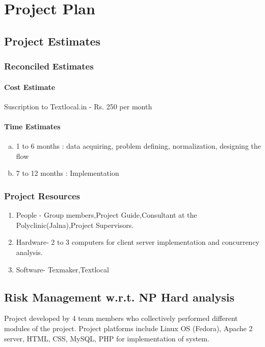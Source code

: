 \documentclass[oneside,a4paper,12pt]{book}
\begin{document}
\chapter{Project Plan}

\section{Project Estimates}
                  
\subsection{Reconciled Estimates}
\subsubsection{Cost Estimate}
Suscription to Textlocal.in - Rs. 250 per month

\subsubsection{Time Estimates}
\begin{enumerate}[(a)]
\item 1 to 6 months : data acquiring, problem defining, normalization, designing the flow 
\item	7 to 12 months : Implementation
\end{enumerate}




\subsection{Project Resources}
         
\begin{enumerate}
\item People - Group members,Project Guide,Consultant at the Polyclinic(Jalna),Project Supervisors.
\item Hardware- 2 to 3 computers for client server implementation and concurrency analysis.
\item Software- Texmaker,Textlocal
\end{enumerate}

\section{Risk Management w.r.t. NP Hard analysis}
Project developed by 4 team members who collectively performed different modules of the project. Project platforms include Linux OS (Fedora), Apache 2 server, HTML, CSS, MySQL, PHP for implementation of system.
\end{document}
